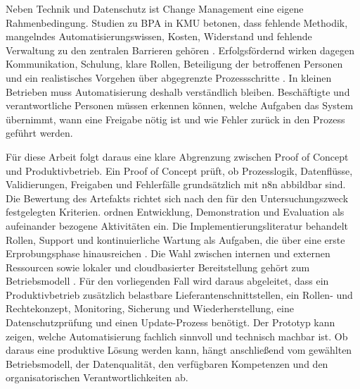 \documentclass[a4paper,12pt]{article}
\begin{document}
Neben Technik und Datenschutz ist Change Management eine eigene Rahmenbedingung. Studien zu BPA in KMU betonen, dass fehlende Methodik, mangelndes Automatisierungswissen, Kosten, Widerstand und fehlende Verwaltung zu den zentralen Barrieren gehören \parencite{moreira_business_2024}. Erfolgsfördernd wirken dagegen Kommunikation, Schulung, klare Rollen, Beteiligung der betroffenen Personen und ein realistisches Vorgehen über abgegrenzte Prozessschritte \parencite{moreira_business_2024,moreira_methodology_2025}. In kleinen Betrieben muss Automatisierung deshalb verständlich bleiben. Beschäftigte und verantwortliche Personen müssen erkennen können, welche Aufgaben das System übernimmt, wann eine Freigabe nötig ist und wie Fehler zurück in den Prozess geführt werden.

Für diese Arbeit folgt daraus eine klare Abgrenzung zwischen Proof of Concept und Produktivbetrieb. Ein Proof of Concept prüft, ob Prozesslogik, Datenflüsse, Validierungen, Freigaben und Fehlerfälle grundsätzlich mit n8n abbildbar sind. Die Bewertung des Artefakts richtet sich nach den für den Untersuchungszweck festgelegten Kriterien. \Textcite{peffers_design_2007} ordnen Entwicklung, Demonstration und Evaluation als aufeinander bezogene Aktivitäten ein. Die Implementierungsliteratur behandelt Rollen, Support und kontinuierliche Wartung als Aufgaben, die über eine erste Erprobungsphase hinausreichen \parencite{herm_framework_2023}. Die Wahl zwischen internen und externen Ressourcen sowie lokaler und cloudbasierter Bereitstellung gehört zum Betriebsmodell \parencite{asatiani_deciding_2023}. Für den vorliegenden Fall wird daraus abgeleitet, dass ein Produktivbetrieb zusätzlich belastbare Lieferantenschnittstellen, ein Rollen- und Rechtekonzept, Monitoring, Sicherung und Wiederherstellung, eine Datenschutzprüfung und einen Update-Prozess benötigt. Der Prototyp kann zeigen, welche Automatisierung fachlich sinnvoll und technisch machbar ist. Ob daraus eine produktive Lösung werden kann, hängt anschließend vom gewählten Betriebsmodell, der Datenqualität, den verfügbaren Kompetenzen und den organisatorischen Verantwortlichkeiten ab.
\end{document}
